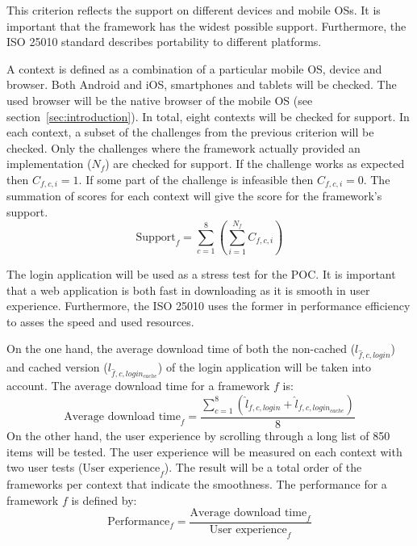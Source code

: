 \documentclass[a4paper]{artikel3}
\newcommand{\setspace}[0]{\vspace{2mm}}
\renewcommand{\paragraph}[1]{\setspace \noindent {\bf #1}  }
\begin{document}
\paragraph{Support}
This criterion reflects the support on different devices and mobile OSs.
It is important that the framework has the widest possible support.
Furthermore, the ISO 25010 standard describes portability to different platforms.

A context is defined as a combination of a particular mobile OS, device and browser.
Both Android and iOS, smartphones and tablets will be checked.
The used browser will be the native browser of the mobile OS (see section~\ref{sec:introduction}).
In total, eight contexts will be checked for support.
In each context,  a subset of the challenges from the previous criterion will be checked.  
Only the challenges where the framework actually provided an implementation ($N_f$) are checked for support.
If the challenge works as expected then $C_{f,c,i} = 1$.
If some part of the challenge is infeasible then $C_{f,c,i} = 0$.
The summation of scores for each context will give the score for the framework's support.
\begin{equation}
  \text{Support}_f = \sum_{c=1}^{8}{\left(\sum\limits_{i=1}^{N_f}C_{f,c,i}\right)}
  \label{eq:ondersteuning}
\end{equation}

\paragraph{Performance}
The login application will be used as a stress test for the POC.
It is important that a web application is both fast in downloading as it is smooth in user experience.
Furthermore, the ISO 25010 uses the former in performance efficiency to asses the speed and used resources.

On the one hand, the average download time of both the non-cached ($l_{\widehat{f},c,login}$) and cached version ($l_{\widehat{f},c,login_{cache}}$) of the login application will be taken into account.
The average download time for a framework $f$ is:
\begin{equation*}
   \text{Average download time}_f= \frac{\sum_{c=1}^{8}{\left(\widehat{l}_{f,c,login}+\widehat{l}_{f,c,login_{cache}}\right)}}{8}
\end{equation*}
On the other hand, the user experience by scrolling through a long list of 850 items will be tested.
The user experience will be measured on each context with two user tests ($\text{User experience}_{f}$).
The result will be a total order of the frameworks per context that indicate the smoothness.
The performance for a framework $f$ is defined by:
\begin{equation}
\text{Performance}_f = \frac{\text{Average download time}_f}{\text{User experience}_f}
  \label{eq:performantie-enhanced}
\end{equation}
\end{document}
